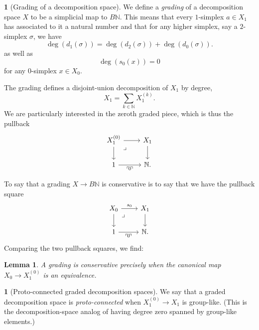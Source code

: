 \documentclass{amsart}
\newcommand{\proto}{proto}
\newcommand{\N}{\mathbb{N}}
\newcommand{\drpullback}{\arrow[phantom]{dr}[very near start,description]{\lrcorner}}
\newcommand{\name}[1]{\ulcorner \!#1\! \urcorner}
\newtheorem{lemma}[theorem]{Lemma}
\theoremstyle{definition}
\theoremstyle{noname}
\newtheorem{blanko}[theorem]{}
\begin{document}
\begin{blanko}[Grading of a decomposition space]\label{grading}
  We define a {\em grading} of a decomposition space $X$ to be a simplicial map to
  $B\N$. This means that every $1$-simplex $a\in X_1$ has associated to it a
  natural number and that for any higher simplex, say a $2$-simplex $\sigma$, we
  have
  \begin{equation*}
  \deg ( d_1(\sigma) ) = \deg( d_2(\sigma)) + \deg(d_0(\sigma)) .
  \end{equation*}
  as well as
  \begin{equation*}
  \deg( s_0(x) ) = 0
  \end{equation*}
  for any $0$-simplex $x \in X_0$.

  The grading defines a disjoint-union decomposition of $X_1$ by degree,
  $$
  X_1 = \sum_{k \in \N} X_1^{(k)} .
  $$
  We are particularly interested in the zeroth graded piece, which is thus the 
  pullback
  \begin{equation}\label{X^(0)}
  \begin{tikzcd}
  X_1^{(0)} \drpullback \ar[d] \ar[r] & X_1 \ar[d] \\
  1 \ar[r, "\name{0}"'] & \N  .
  \end{tikzcd}
  \end{equation}
  
  \end{blanko}



To say that a grading  $X\to B\N$ is conservative is to say that we have the
pullback square
\begin{equation}
  \label{eq:cons}
\begin{tikzcd}
  X_0 \drpullback \ar[d] \ar[r, "s_0"] & X_1 \ar[d] \\
  1 \ar[r, "\name{0}"'] & \N .
  \end{tikzcd}
\end{equation}
Comparing the two pullback squares, we find:


  \begin{lemma}\label{0=0}
    A grading is conservative precisely 
    when the canonical map $X_0 \to X_1^{(0)}$ is an equivalence.
  \end{lemma}
  



\begin{blanko}[Proto-connected graded decomposition spaces]\label{proto}
  We say that a graded decomposition space is {\em \proto-connected} when 
  $X_1^{(0)} \to X_1$ is group-like. (This is the decomposition-space analog of
  having degree zero spanned by group-like elements.)
\end{blanko}
\end{document}
